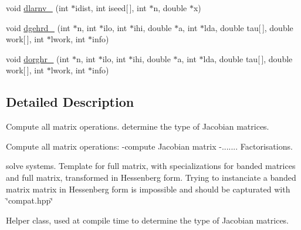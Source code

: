 \begin{DoxyCompactItemize}
\item 
void \hyperlink{namespaceodes_aee13c6130981afb5d561ed5a7d61f523}{dlarnv\-\_\-} (int $\ast$idist, int iseed\mbox{[}$\,$\mbox{]}, int $\ast$n, double $\ast$x)
\item 
void \hyperlink{namespaceodes_a8e1a54591e1e244caf5bdda4a798210d}{dgehrd\-\_\-} (int $\ast$n, int $\ast$ilo, int $\ast$ihi, double $\ast$a, int $\ast$lda, double tau\mbox{[}$\,$\mbox{]}, double work\mbox{[}$\,$\mbox{]}, int $\ast$lwork, int $\ast$info)
\item 
void \hyperlink{namespaceodes_adff449269843fe4af255e0956be12fd0}{dorghr\-\_\-} (int $\ast$n, int $\ast$ilo, int $\ast$ihi, double $\ast$a, int $\ast$lda, double tau\mbox{[}$\,$\mbox{]}, double work\mbox{[}$\,$\mbox{]}, int $\ast$lwork, int $\ast$info)
\end{DoxyCompactItemize}


\subsection{Detailed Description}
Compute all matrix operations. determine the type of Jacobian matrices.

Compute all matrix operations\-: -\/compute Jacobian matrix -\/....... Factorisations.
\begin{DoxyItemize}
\item solve systems. Template for full matrix, with specializations for banded matrices and full matrix, transformed in Hessenberg form. Trying to instanciate a banded matrix matrix in Hessenberg form is impossible and should be capturated with \char`\"{}compat.\-hpp\char`\"{}
\end{DoxyItemize}

Helper class, used at compile time to determine the type of Jacobian matrices. 

